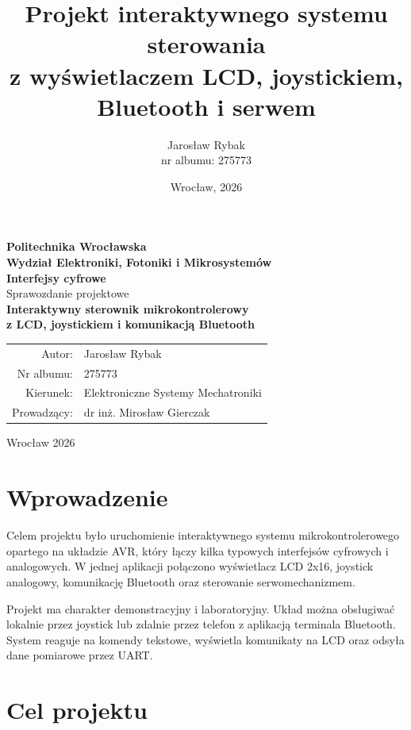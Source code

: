 \documentclass[a4paper,12pt]{article}
\title{\textbf{Projekt interaktywnego systemu sterowania\\z wyświetlaczem LCD, joystickiem, Bluetooth i serwem}}
\author{Jarosław Rybak \\ nr albumu: 275773}
\date{Wrocław, 2026}
\begin{document}
\begin{titlepage}
    \centering
    \vspace*{1cm}

    {\Large \textbf{Politechnika Wrocławska}}\\[0.2cm]
    {\large \textbf{Wydział Elektroniki, Fotoniki i Mikrosystemów}}\\[2.5cm]

    {\huge \textbf{Interfejsy cyfrowe}}\\[0.5cm]
    {\LARGE Sprawozdanie projektowe}\\[1.5cm]

    {\Large \textbf{Interaktywny sterownik mikrokontrolerowy\\z LCD, joystickiem i komunikacją Bluetooth}}\\[3cm]

    \begin{flushright}
        \begin{tabular}{rl}
            Autor: & Jarosław Rybak \\
            Nr albumu: & 275773 \\
            Kierunek: & Elektroniczne Systemy Mechatroniki \\
            Prowadzący: & dr inż. Mirosław Gierczak
        \end{tabular}
    \end{flushright}

    \vfill
    {\large Wrocław 2026}
\end{titlepage}

\tableofcontents
\newpage

\section{Wprowadzenie}

Celem projektu było uruchomienie interaktywnego systemu mikrokontrolerowego opartego na układzie AVR, który łączy kilka typowych interfejsów cyfrowych i analogowych. W jednej aplikacji połączono wyświetlacz LCD 2x16, joystick analogowy, komunikację Bluetooth oraz sterowanie serwomechanizmem.

Projekt ma charakter demonstracyjny i laboratoryjny. Układ można obsługiwać lokalnie przez joystick lub zdalnie przez telefon z aplikacją terminala Bluetooth. System reaguje na komendy tekstowe, wyświetla komunikaty na LCD oraz odsyła dane pomiarowe przez UART.

\section{Cel projektu}
\end{document}
